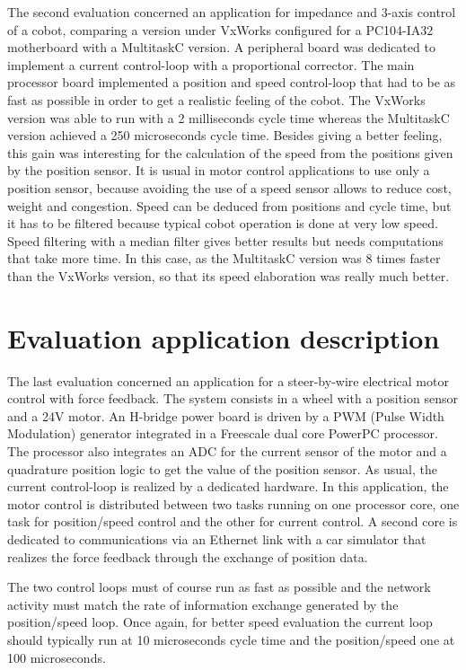 \documentclass[10pt]{report}
\begin{document}
The second evaluation concerned an application for impedance and 3-axis control of a cobot, comparing a version under VxWorks configured 
for a PC104-IA32 motherboard with a MultitaskC version. A peripheral board was dedicated to implement a current control-loop with a
proportional corrector. The main processor board implemented a position and speed control-loop that had to be as fast as possible 
in order to get a realistic feeling of the cobot. The VxWorks version was able to run with a 2 milliseconds cycle time 
whereas the MultitaskC version achieved a 250 microseconds cycle time. Besides giving a better feeling, this gain was interesting 
for the calculation of the speed from the positions given by the position sensor. It is usual in motor control applications to use only 
a position sensor, because avoiding the use of a speed sensor allows to reduce cost, weight and congestion. Speed can be deduced from 
positions and cycle time, but it has to be filtered because typical cobot operation is done at very low speed. Speed filtering with 
a median filter gives better results but needs computations that take more time. In this case, as the MultitaskC version was
8 times faster than the VxWorks version, so that its speed elaboration was really much better.

\section{Evaluation application description}

The last evaluation concerned an application for a steer-by-wire electrical motor control with force feedback.
The system consists in a wheel with a position sensor and a 24V motor. An H-bridge power board is driven
by a PWM (Pulse Width Modulation) generator integrated in a Freescale dual core PowerPC processor. The
processor also integrates an ADC for the current sensor of the motor and a quadrature position logic to get the 
value of the position sensor. As usual, the current control-loop is realized by a dedicated hardware.
In this application, the motor control is distributed between two tasks running on one processor core, one task 
for position/speed control and the other for current control. A second core is dedicated to communications via an Ethernet
link with a car simulator that realizes the force feedback through the exchange of position data.

The two control loops must of course run as fast as possible and the network activity must match the rate 
of information exchange generated by the position/speed loop. Once again, for better speed evaluation the current loop should 
typically run at 10 microseconds cycle time and the position/speed one at 100 microseconds.
\end{document}
